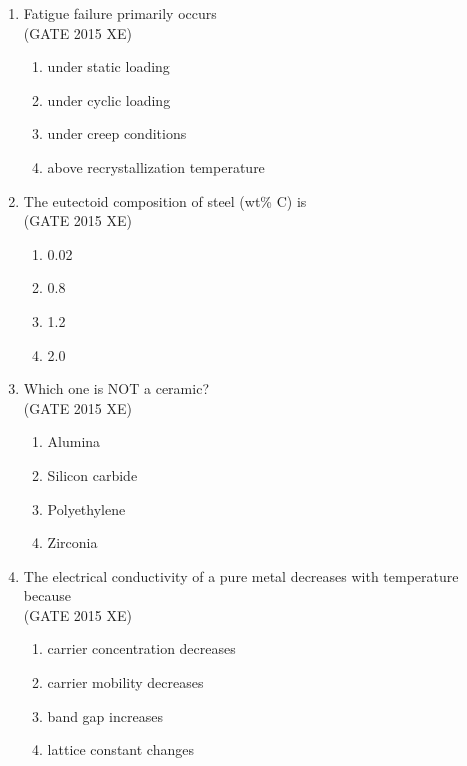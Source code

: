 \documentclass[journal,12pt,onecolumn]{IEEEtran}
\begin{document}
\begin{enumerate}
\item Fatigue failure primarily occurs \\
\hfill{(GATE 2015 XE)} 
\begin{multicols}{4}
\begin{enumerate}
\item under static loading
\item under cyclic loading
\item under creep conditions
\item above recrystallization temperature
\end{enumerate}
\end{multicols}

\item The eutectoid composition of steel (wt\% C) is  \\
\hfill{(GATE 2015 XE)} 

\begin{multicols}{4}
\begin{enumerate}
\item 0.02
\item 0.8
\item 1.2
\item 2.0
\end{enumerate}
\end{multicols}

\item Which one is NOT a ceramic?  \\
\hfill{(GATE 2015 XE)} 
\begin{multicols}{4}
\begin{enumerate}
\item Alumina
\item Silicon carbide
\item Polyethylene
\item Zirconia
\end{enumerate}
\end{multicols}

\item The electrical conductivity of a pure metal decreases with temperature because\\
\hfill{(GATE 2015 XE)} 

\begin{multicols}{2}
\begin{enumerate}
\item carrier concentration decreases
\item carrier mobility decreases
\item band gap increases
\item lattice constant changes
\end{enumerate}
\end{multicols}


\end{enumerate}
\end{document}
